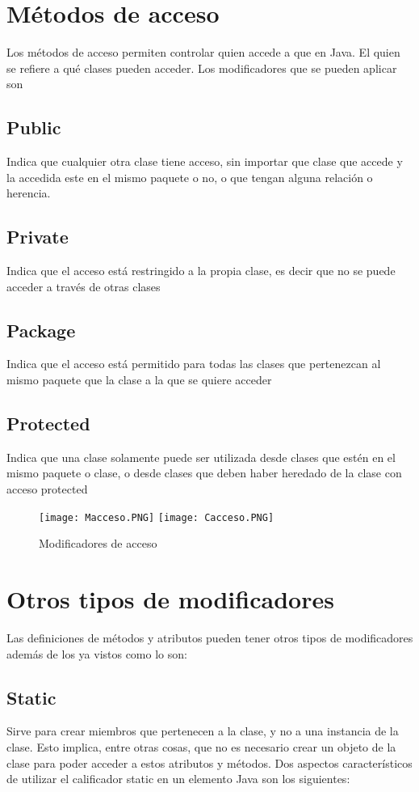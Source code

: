 \documentclass[12pt,letterpaper]{article}
\begin{document}
\section{Métodos de acceso}
Los métodos de acceso permiten controlar quien accede a que en Java. El quien se refiere a qué clases pueden acceder. Los modificadores que se pueden aplicar son 
\subsection*{Public}
Indica que cualquier otra clase tiene acceso, sin importar que clase que accede y la accedida este en el mismo paquete o no, o que tengan alguna relación o herencia.
\subsection*{Private}
Indica que el acceso está restringido a la propia clase, es decir que no se puede acceder a través de otras clases
\subsection*{Package}
Indica que el acceso está permitido para todas las clases que pertenezcan al mismo paquete que la clase a la que se quiere acceder 
\subsection*{Protected}
Indica que una clase solamente puede ser utilizada desde clases que estén en el mismo paquete o clase, o desde clases que deben haber heredado de la clase con acceso protected

\begin{figure}[hbtp]
\centering
\texttt{[image: Macceso.PNG]}
\texttt{[image: Cacceso.PNG]}
\caption{Modificadores de acceso}
\end{figure}

\section{Otros tipos de modificadores}
Las definiciones de métodos y atributos pueden tener otros tipos de modificadores además de los ya vistos como lo son:
\subsection*{Static}
Sirve para crear miembros que pertenecen a la clase, y no a una instancia de la clase. Esto implica, entre otras cosas, que no es necesario crear un objeto de la clase para poder acceder a estos atributos y métodos.
Dos aspectos característicos de utilizar el calificador static en un elemento Java son los siguientes:
\end{document}

